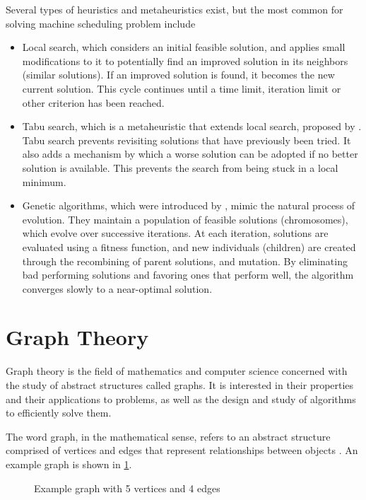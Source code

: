 \documentclass{mimosis}
\begin{document}
Several types of heuristics and metaheuristics exist, but the most common for solving machine scheduling problem include
\begin{itemize}
\item Local search, which considers an initial feasible solution, and applies small modifications to it to potentially find an improved solution in its neighbors (similar solutions). If an improved solution is found, it becomes the new current solution. This cycle continues until a time limit, iteration limit or other criterion has been reached.
\item Tabu search, which is a metaheuristic that extends local search, proposed by \citet{glover1986, glover1989}. Tabu search prevents revisiting solutions that have previously been tried. It also adds a mechanism by which a worse solution can be adopted if no better solution is available. This prevents the search from being stuck in a local minimum.
\item Genetic algorithms, which were introduced by \citet{holland1975adaptation}, mimic the natural process of evolution. They maintain a population of feasible solutions (chromosomes), which evolve over successive iterations. At each iteration, solutions are evaluated using a fitness function, and new individuals (children) are created through the recombining of parent solutions, and mutation. By eliminating bad performing solutions and favoring ones that perform well, the algorithm converges slowly to a near-optimal solution.
\end{itemize} 

\section{Graph Theory}
Graph theory is the field of mathematics and computer science concerned with the study of abstract structures called graphs. 
It is interested in their properties and their applications to problems, as well as the design and study of algorithms to efficiently solve them. 


The word graph, in the mathematical sense, refers to an abstract structure comprised of vertices and edges that represent relationships between objects \citep{schrijver2003}. An example graph is shown in \cref{fig:graph_example}.

\begin{figure}[h!]
    \centering
    \caption{Example graph with 5 vertices and 4 edges}
    \label{fig:graph_example}
\end{figure}
\end{document}
